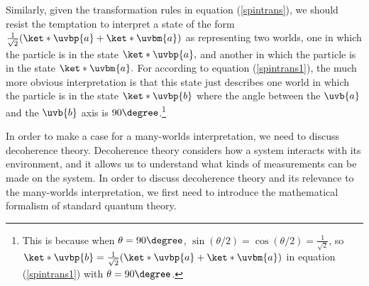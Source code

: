 \documentclass[12pt]{report}
\begin{document}
    Similarly, given the transformation rules in equation (\ref{spintrans}), we should resist the temptation  to interpret a state of the form $\frac{1}{\sqrt{2}}(\ket*{\uvbp{a}}+\ket*{\uvbm{a}})$ as representing two worlds, one in which the particle is in the state $\ket*{\uvbp{a}},$ and another in which the particle is in the state $\ket*{\uvbm{a}}.$ For according to equation (\ref{spintrans1}), the much more obvious interpretation is that this state just describes one world in which the particle is in the state $\ket*{\uvbp{b}}$ where the angle between
     the $\uvb{a}$ and the  $\uvb{b}$ axis is $90\degree$.\footnote{This is because when $\theta=90\degree$, $\sin(\theta/2)=\cos(\theta/2)=\frac{1}{\sqrt{2}}$, so  $\ket*{\uvbp{b}}= \frac{1}{\sqrt{2}}(\ket*{\uvbp{a}}+\ket*{\uvbm{a}})$ in equation (\ref{spintrans1}) with $\theta=90\degree$. } 

    In order to make a case for a many-worlds interpretation, we need to discuss decoherence theory. Decoherence theory considers how a system interacts with its environment, and it allows us to understand what kinds of measurements can be made on the system. In order to discuss decoherence theory and its relevance to the many-worlds interpretation, we first need to introduce the mathematical formalism of standard quantum theory.


\end{document}
